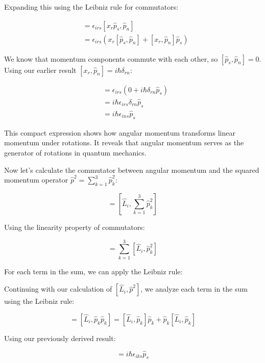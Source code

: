 Expanding this using the Leibniz rule for commutators:

\begin{align}
[\hat{L}_i, \hat{p}_n] &= \epsilon_{irs}[x_r\hat{p}_s, \hat{p}_n] \\
&= \epsilon_{irs}(x_r[\hat{p}_s, \hat{p}_n] + [x_r, \hat{p}_n]\hat{p}_s)
\end{align}

We know that momentum components commute with each other, so $[\hat{p}_s, \hat{p}_n] = 0$. Using our earlier result $[x_r, \hat{p}_n] = i\hbar\delta_{rn}$:

\begin{align}
[\hat{L}_i, \hat{p}_n] &= \epsilon_{irs}(0 + i\hbar\delta_{rn}\hat{p}_s) \\
&= i\hbar\epsilon_{irs}\delta_{rn}\hat{p}_s \\
&= i\hbar\epsilon_{ins}\hat{p}_s
\end{align}

This compact expression shows how angular momentum transforms linear momentum under rotations. It reveals that angular momentum serves as the generator of rotations in quantum mechanics.

Now let's calculate the commutator between angular momentum and the squared momentum operator $\hat{p}^2 = \sum_{k=1}^3 \hat{p}_k^2$:

\begin{equation}
[\hat{L}_i, \hat{p}^2] = \left[\hat{L}_i, \sum_{k=1}^3 \hat{p}_k^2\right]
\end{equation}

Using the linearity property of commutators:

\begin{equation}
[\hat{L}_i, \hat{p}^2] = \sum_{k=1}^3 [\hat{L}_i, \hat{p}_k^2]
\end{equation}

For each term in the sum, we can apply the Leibniz rule:

Continuing with our calculation of $[\hat{L}_i, \hat{p}^2]$, we analyze each term in the sum using the Leibniz rule:

\begin{equation}
[\hat{L}_i, \hat{p}_k^2] = [\hat{L}_i, \hat{p}_k\hat{p}_k] = [\hat{L}_i, \hat{p}_k]\hat{p}_k + \hat{p}_k[\hat{L}_i, \hat{p}_k] \label{eq:1.68}
\end{equation}

Using our previously derived result:

\begin{equation}
[\hat{L}_i, \hat{p}_k] = i\hbar\epsilon_{iks}\hat{p}_s
\end{equation}

